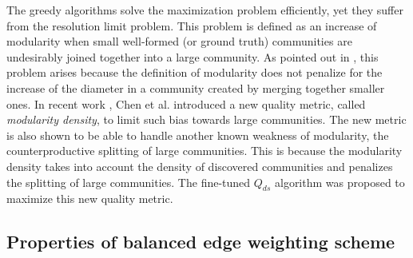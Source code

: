 The greedy algorithms solve the maximization problem efficiently, yet they suffer from the resolution limit problem. This problem is defined as an increase of modularity when small well-formed (or ground truth) communities are undesirably joined together into a large community. As pointed out in \cite{fortunato2007resolution,fortunato2016community}, this problem arises because the definition of modularity does not penalize for the increase of the diameter in a community created by merging together smaller ones. In recent work \cite{chen2015new}, Chen et al. introduced a new quality metric, called {\it modularity density}, to limit such bias towards large communities. The new metric is also shown to be able to handle another known weakness of modularity, the counterproductive splitting of large communities. This is because the modularity density takes into account the density of discovered communities and penalizes the splitting of large communities. The fine-tuned $Q_{ds}$ algorithm \cite{chen2014community} was proposed to maximize this new quality metric.


\subsection{Properties of balanced edge weighting scheme}

